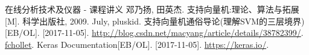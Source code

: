 \documentclass[a4paper]{article}
\begin{document}
	\small
	\renewcommand{\refname}{参考资料}
	\begin{thebibliography}{9}
		\bibitem{} 在线分析技术及仪器 - 课程讲义
		\bibitem{} 邓乃扬, 田英杰. 支持向量机:理论、算法与拓展[M]. 科学出版社, 2009.
		\bibitem{} July, pluskid. 支持向量机通俗导论(理解SVM的三层境界)[EB/OL]. [2017-11-05]. \url{http://blog.csdn.net/macyang/article/details/38782399/}.
		\bibitem{} \href{https://github.com/fchollet}{fchollet}. Keras Documentation[EB/OL]. [2017-11-05]. \url{https://keras.io/}.
	\end{thebibliography}
\end{document}

